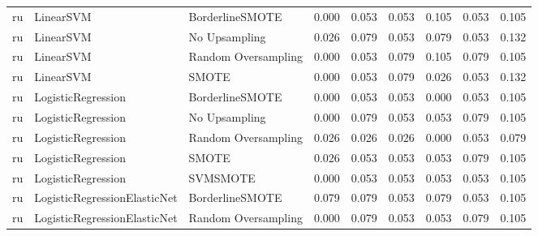 \begin{tabular}{lllllllll}
      ru &                    LinearSVM &     BorderlineSMOTE & 0.000 &                     0.053 &                 0.053 &                  0.105 &                                   0.053 &     0.105 \\
      ru &                    LinearSVM &       No Upsampling & 0.026 &                     0.079 &                 0.053 &                  0.079 &                                   0.053 &     0.132 \\
      ru &                    LinearSVM & Random Oversampling & 0.000 &                     0.053 &                 0.079 &                  0.105 &                                   0.079 &     0.105 \\
      ru &                    LinearSVM &               SMOTE & 0.000 &                     0.053 &                 0.079 &                  0.026 &                                   0.053 &     0.132 \\
      ru &           LogisticRegression &     BorderlineSMOTE & 0.000 &                     0.053 &                 0.053 &                  0.000 &                                   0.053 &     0.105 \\
      ru &           LogisticRegression &       No Upsampling & 0.000 &                     0.079 &                 0.053 &                  0.053 &                                   0.079 &     0.105 \\
      ru &           LogisticRegression & Random Oversampling & 0.026 &                     0.026 &                 0.026 &                  0.000 &                                   0.053 &     0.079 \\
      ru &           LogisticRegression &               SMOTE & 0.026 &                     0.053 &                 0.053 &                  0.053 &                                   0.079 &     0.105 \\
      ru &           LogisticRegression &            SVMSMOTE & 0.000 &                     0.053 &                 0.053 &                  0.053 &                                   0.053 &     0.105 \\
      ru & LogisticRegressionElasticNet &     BorderlineSMOTE & 0.079 &                     0.079 &                 0.053 &                  0.079 &                                   0.053 &     0.105 \\
      ru & LogisticRegressionElasticNet & Random Oversampling & 0.000 &                     0.079 &                 0.053 &                  0.053 &                                   0.079 &     0.105 \\

\end{tabular}
